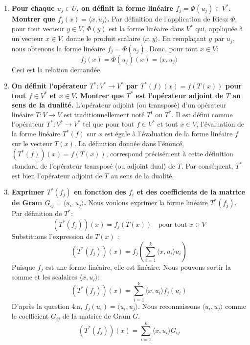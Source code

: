 \documentclass[11pt,a4paper]{report}
\begin{document}
\begin{enumerate}
  \begin{enumerate}
  \def\labelenumii{\alph{enumii}.}
  \item
    \textbf{Pour chaque \(u_j \in U\), on définit la forme linéaire
    \(f_j = \Phi(u_j) \in V^*\). Montrer que
    \(f_j(x) = \langle x, u_j \rangle\).} Par définition de
    l'application de Riesz \(\Phi\), pour tout vecteur \(y \in V\),
    \(\Phi(y)\) est la forme linéaire dans \(V^*\) qui, appliquée à un
    vecteur \(x \in V\), donne le produit scalaire
    \(\langle x, y \rangle\). En remplaçant \(y\) par \(u_j\), nous
    obtenons la forme linéaire \(f_j = \Phi(u_j)\). Donc, pour tout
    \(x \in V\): \[ f_j(x) = \Phi(u_j)(x) = \langle x, u_j \rangle \]
    Ceci est la relation demandée.
  \item
    \textbf{On définit l'opérateur \(T^*: V^* \to V^*\) par
    \(T^*(f)(x) = f(T(x))\) pour tout \(f \in V^*\) et \(x \in V\).
    Montrer que \(T^*\) est l'opérateur adjoint de \(T\) au sens de la
    dualité.} L'opérateur adjoint (ou transposé) d'un opérateur linéaire
    \(T: V \to V\) est traditionnellement noté \(T^t\) ou \(T^*\). Il
    est défini comme l'opérateur \(T^*: V^* \to V^*\) tel que pour tout
    \(f \in V^*\) et tout \(x \in V\), l'évaluation de la forme linéaire
    \(T^*(f)\) sur \(x\) est égale à l'évaluation de la forme linéaire
    \(f\) sur le vecteur \(T(x)\). La définition donnée dans l'énoncé,
    \((T^*(f))(x) = f(T(x))\), correspond précisément à cette définition
    standard de l'opérateur transposé (ou adjoint dual) de \(T\). Par
    conséquent, \(T^*\) est bien l'opérateur adjoint de \(T\) au sens de
    la dualité.
  \item
    \textbf{Exprimer \(T^*(f_j)\) en fonction des \(f_i\) et des
    coefficients de la matrice de Gram
    \(G_{ij} = \langle u_i, u_j \rangle\).} Nous voulons exprimer la
    forme linéaire \(T^*(f_j)\). Par définition de \(T^*\):
    \[ (T^*(f_j))(x) = f_j(T(x)) \quad \text{pour tout } x \in V \]
    Substituons l'expression de \(T(x)\) :
    \[ (T^*(f_j))(x) = f_j\left( \sum_{i=1}^k \langle x, u_i \rangle u_i \right) \]
    Puisque \(f_j\) est une forme linéaire, elle est linéaire. Nous
    pouvons sortir la somme et les scalaires \(\langle x, u_i \rangle\):
    \[ (T^*(f_j))(x) = \sum_{i=1}^k \langle x, u_i \rangle f_j(u_i) \]
    D'après la question 4.a, \(f_j(u_i) = \langle u_i, u_j \rangle\).
    Nous reconnaissons \(\langle u_i, u_j \rangle\) comme le coefficient
    \(G_{ij}\) de la matrice de Gram \(G\).
    \[ (T^*(f_j))(x) = \sum_{i=1}^k \langle x, u_i \rangle G_{ij} \]

\end{enumerate}
\end{enumerate}
\end{document}
